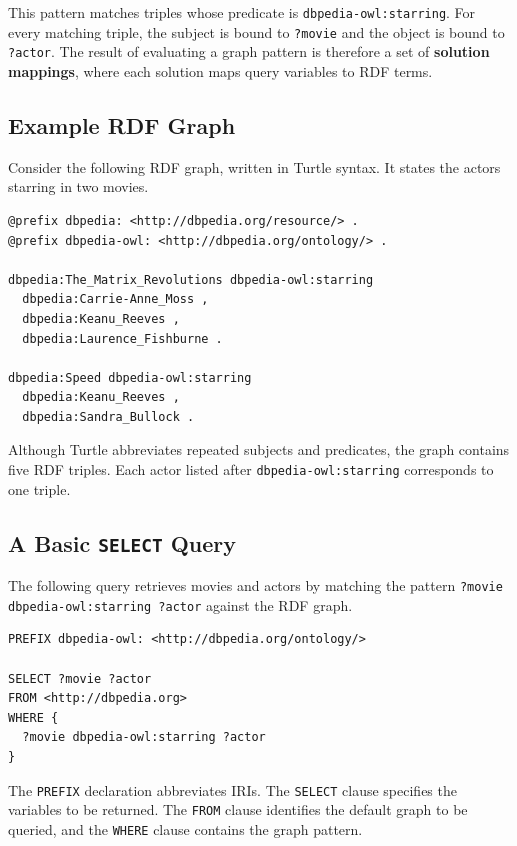\documentclass{scrbook}
\begin{document}
	This pattern matches triples whose predicate is \texttt{dbpedia-owl:starring}. For every matching triple, the subject is bound to \texttt{?movie} and the object is bound to \texttt{?actor}. The result of evaluating a graph pattern is therefore a set of \textbf{solution mappings}, where each solution maps query variables to RDF terms.
	
	\subsection{Example RDF Graph}
	
	Consider the following RDF graph, written in Turtle syntax. It states the actors starring in two movies.
	
	\begin{lstlisting}
@prefix dbpedia: <http://dbpedia.org/resource/> .
@prefix dbpedia-owl: <http://dbpedia.org/ontology/> .

dbpedia:The_Matrix_Revolutions dbpedia-owl:starring
  dbpedia:Carrie-Anne_Moss ,
  dbpedia:Keanu_Reeves ,
  dbpedia:Laurence_Fishburne .
	
dbpedia:Speed dbpedia-owl:starring
  dbpedia:Keanu_Reeves ,
  dbpedia:Sandra_Bullock .
	\end{lstlisting}
	
	Although Turtle abbreviates repeated subjects and predicates, the graph contains five RDF triples. Each actor listed after \texttt{dbpedia-owl:starring} corresponds to one triple.
	
	\subsection{A Basic \texttt{SELECT} Query}
	
	The following query retrieves movies and actors by matching the pattern \texttt{?movie dbpedia-owl:starring ?actor} against the RDF graph.
	
	\begin{lstlisting}
PREFIX dbpedia-owl: <http://dbpedia.org/ontology/>

SELECT ?movie ?actor
FROM <http://dbpedia.org>
WHERE {
  ?movie dbpedia-owl:starring ?actor
}
	\end{lstlisting}
	
	The \texttt{PREFIX} declaration abbreviates IRIs. The \texttt{SELECT} clause specifies the variables to be returned. The \texttt{FROM} clause identifies the default graph to be queried, and the \texttt{WHERE} clause contains the graph pattern.\\
	
\end{document}
